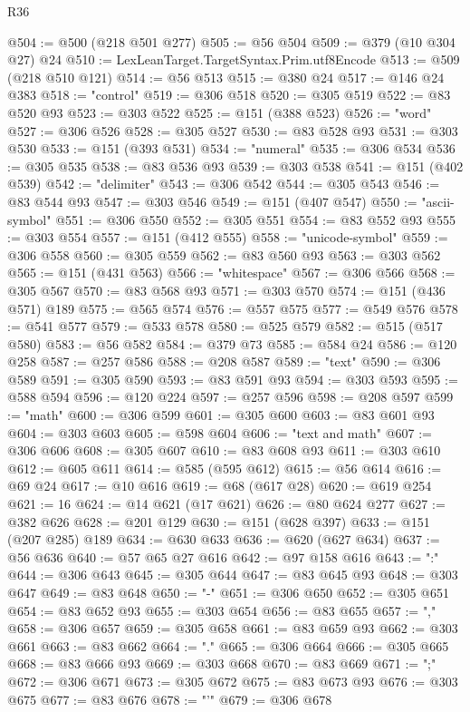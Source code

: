 \begin{lexlean}{R36}
\begin{coremodule}
@504 := @500 (@218 @501 @277)
@505 := @56 @504
@509 := @379 (@10 @304 @27) @24
@510 := LexLeanTarget.TargetSyntax.Prim.utf8Encode
@513 := @509 (@218 @510 @121)
@514 := @56 @513
@515 := @380 @24
@517 := @146 @24 @383
@518 := "control"
@519 := @306 @518
@520 := @305 @519
@522 := @83 @520 @93
@523 := @303 @522
@525 := @151 (@388 @523)
@526 := "word"
@527 := @306 @526
@528 := @305 @527
@530 := @83 @528 @93
@531 := @303 @530
@533 := @151 (@393 @531)
@534 := "numeral"
@535 := @306 @534
@536 := @305 @535
@538 := @83 @536 @93
@539 := @303 @538
@541 := @151 (@402 @539)
@542 := "delimiter"
@543 := @306 @542
@544 := @305 @543
@546 := @83 @544 @93
@547 := @303 @546
@549 := @151 (@407 @547)
@550 := "ascii-symbol"
@551 := @306 @550
@552 := @305 @551
@554 := @83 @552 @93
@555 := @303 @554
@557 := @151 (@412 @555)
@558 := "unicode-symbol"
@559 := @306 @558
@560 := @305 @559
@562 := @83 @560 @93
@563 := @303 @562
@565 := @151 (@431 @563)
@566 := "whitespace"
@567 := @306 @566
@568 := @305 @567
@570 := @83 @568 @93
@571 := @303 @570
@574 := @151 (@436 @571) @189
@575 := @565 @574
@576 := @557 @575
@577 := @549 @576
@578 := @541 @577
@579 := @533 @578
@580 := @525 @579
@582 := @515 (@517 @580)
@583 := @56 @582
@584 := @379 @73
@585 := @584 @24
@586 := @120 @258
@587 := @257 @586
@588 := @208 @587
@589 := "text"
@590 := @306 @589
@591 := @305 @590
@593 := @83 @591 @93
@594 := @303 @593
@595 := @588 @594
@596 := @120 @224
@597 := @257 @596
@598 := @208 @597
@599 := "math"
@600 := @306 @599
@601 := @305 @600
@603 := @83 @601 @93
@604 := @303 @603
@605 := @598 @604
@606 := "text and math"
@607 := @306 @606
@608 := @305 @607
@610 := @83 @608 @93
@611 := @303 @610
@612 := @605 @611
@614 := @585 (@595 @612)
@615 := @56 @614
@616 := @69 @24
@617 := @10 @616
@619 := @68 (@617 @28)
@620 := @619 @254
@621 := 16
@624 := @14 @621 (@17 @621)
@626 := @80 @624 @277
@627 := @382 @626
@628 := @201 @129
@630 := @151 (@628 @397)
@633 := @151 (@207 @285) @189
@634 := @630 @633
@636 := @620 (@627 @634)
@637 := @56 @636
@640 := @57 @65 @27 @616
@642 := @97 @158 @616
@643 := ":"
@644 := @306 @643
@645 := @305 @644
@647 := @83 @645 @93
@648 := @303 @647
@649 := @83 @648
@650 := "-"
@651 := @306 @650
@652 := @305 @651
@654 := @83 @652 @93
@655 := @303 @654
@656 := @83 @655
@657 := ","
@658 := @306 @657
@659 := @305 @658
@661 := @83 @659 @93
@662 := @303 @661
@663 := @83 @662
@664 := "."
@665 := @306 @664
@666 := @305 @665
@668 := @83 @666 @93
@669 := @303 @668
@670 := @83 @669
@671 := ";"
@672 := @306 @671
@673 := @305 @672
@675 := @83 @673 @93
@676 := @303 @675
@677 := @83 @676
@678 := "'"
@679 := @306 @678

\end{coremodule}
\end{lexlean}
